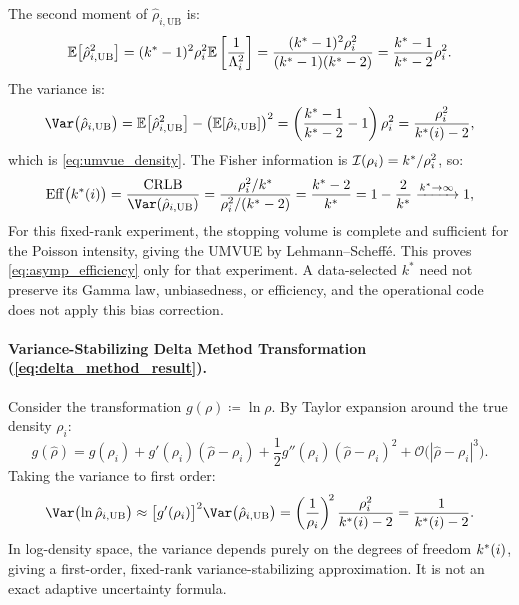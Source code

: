 The second moment of $\hat{\rho}_{i, \mathrm{UB}}$ is:
\begin{equation}
  \mathbb{E}\bigl[\hat{\rho}_{i, \mathrm{UB}}^2\bigr] = (k^{*} -
  1)^2 \rho_i^2 \mathbb{E}\left[\frac{1}{\Lambda_i^2}\right] =
  \frac{(k^{*} - 1)^2 \rho_i^2}{(k^{*} - 1)(k^{*} - 2)} =
  \frac{k^{*} - 1}{k^{*} - 2}\rho_i^2.
\end{equation}
The variance is:
\begin{equation}
  \Var\bigl(\hat{\rho}_{i, \mathrm{UB}}\bigr) =
  \mathbb{E}\bigl[\hat{\rho}_{i, \mathrm{UB}}^2\bigr] -
  \bigl(\mathbb{E}[\hat{\rho}_{i, \mathrm{UB}}]\bigr)^2 = \left(
  \frac{\kstar - 1}{\kstar - 2} - 1 \right)\rho_i^2 =
  \frac{\rho_i^2}{\kstar(i) - 2},
  \label{eq:supp_umvue_var_eval}
\end{equation}
which is \cref{eq:umvue_density}. The Fisher information is
$\mathcal{I}(\rho_i) = k^{*} / \rho_i^2$, so:
\begin{equation}
  \operatorname{Eff}\bigl(\kstar(i)\bigr) =
  \frac{\mathrm{CRLB}}{\Var(\hat{\rho}_{i, \mathrm{UB}})} =
  \frac{\rho_i^2 / \kstar}{\rho_i^2 / (\kstar - 2)} = \frac{\kstar -
  2}{\kstar} = 1 - \frac{2}{\kstar} \xrightarrow{\kstar \to \infty} 1,
\end{equation}
For this fixed-rank experiment, the stopping volume is complete and
sufficient for the Poisson intensity, giving the UMVUE by
Lehmann--Scheff\'e. This proves \cref{eq:asymp_efficiency} only for
that experiment. A data-selected $k^*$ need not preserve its Gamma law,
unbiasedness, or efficiency, and the operational code does not apply
this bias correction.

\paragraph{Variance-Stabilizing Delta Method Transformation
(\cref{eq:delta_method_result}).}
Consider the transformation $g(\rho) \coloneqq \ln\rho$. By Taylor
expansion around the true density $\rho_i$:
\begin{equation}
  g(\hat{\rho}) = g(\rho_i) + g'(\rho_i)(\hat{\rho} - \rho_i) +
  \frac{1}{2}g''(\rho_i)(\hat{\rho} - \rho_i)^2 +
  \mathcal{O}\bigl(|\hat{\rho} - \rho_i|^3\bigr).
\end{equation}
Taking the variance to first order:
\begin{equation}
  \Var\bigl(\ln \hat{\rho}_{i, \mathrm{UB}}\bigr) \approx
  \bigl[g'(\rho_i)\bigr]^2 \Var\bigl(\hat{\rho}_{i, \mathrm{UB}}\bigr)
  = \left(\frac{1}{\rho_i}\right)^{\!2} \frac{\rho_i^2}{\kstar(i) -
  2} = \frac{1}{\kstar(i) - 2}.
\end{equation}
In log-density space, the variance depends purely on the degrees of
freedom $k^{*}(i)$,
giving a first-order, fixed-rank variance-stabilizing approximation.
It is not an exact adaptive uncertainty formula.

